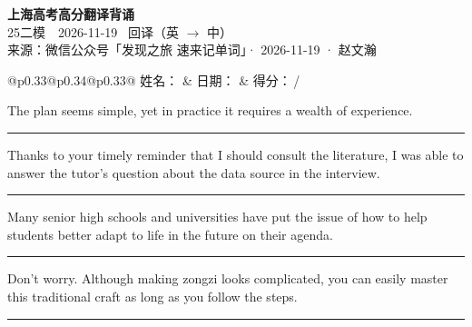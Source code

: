 \documentclass[11pt,a4paper]{article}
\newcommand{\num}[1]{\makebox[1.9em][r]{#1.}\hspace{0.3em}}
\newcommand{\wline}{\noindent\rule{\linewidth}{0.4pt}}
\begin{document}
\pagestyle{plain}
\begin{center}
{\LARGE\bfseries 上海高考高分翻译背诵 }\\[0.25em]
{\large 25二模　2026-11-19 \quad\ 回译（英 $\to$ 中）}\\[0.35em]
{\footnotesize 来源：微信公众号「发现之旅 速来记单词」· 2026-11-19 · 赵文瀚}
\end{center}

\vspace{0.4em}
\noindent\begin{tabular}{@{}p{0.33\textwidth}@{}p{0.34\textwidth}@{}p{0.33\textwidth}@{}}
姓名：\underline{\hspace{2.0cm}} & 日期：\underline{\hspace{2.0cm}} & 得分：\underline{\hspace{1.4cm}}\,/ \\
\end{tabular}

\vspace{0.5em}

\vspace{0.8em}
\num{1}The plan seems simple, yet in practice it requires a wealth of experience.

\vspace{0.25em}

\wline

\num{2}Thanks to your timely reminder that I should consult the literature, I was able to answer the tutor’s question about the data source in the interview.

\vspace{0.25em}

\wline

\num{3}Many senior high schools and universities have put the issue of how to help students better adapt to life in the future on their agenda.

\vspace{0.25em}

\wline

\num{4}Don’t worry. Although making zongzi looks complicated, you can easily master this traditional craft as long as you follow the steps.

\vspace{0.25em}

\wline
\end{document}
